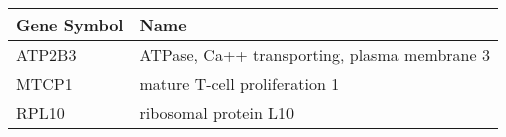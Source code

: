 \begin{tabular}{ll}
\toprule
Gene Symbol &                                         Name \\
\midrule
     ATP2B3 & ATPase, Ca++ transporting, plasma membrane 3 \\
      MTCP1 &                mature T-cell proliferation 1 \\
      RPL10 &                        ribosomal protein L10 \\
\bottomrule
\end{tabular}
